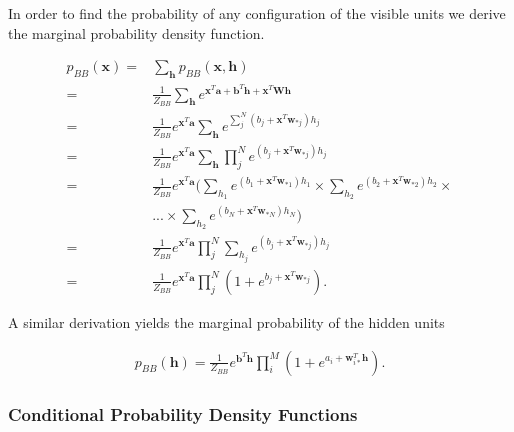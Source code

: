 In order to find the probability of any configuration of the visible units we derive the marginal probability density function.

\begin{align}
	p_{BB} (\bm{x}) =& \sum_{\bm{h}} p_{BB} (\bm{x}, \bm{h}) \\
	=& \frac{1}{Z_{BB}} \sum_{\bm{h}} e^{\bm{x}^T \bm{a} + \bm{b}^T \bm{h} + \bm{x}^T \bm{W} \bm{h}} \nonumber \\
	=& \frac{1}{Z_{BB}} e^{\bm{x}^T \bm{a}} \sum_{\bm{h}} e^{\sum_j^N (b_j + \bm{x}^T \bm{w}_{\ast j})h_j} \nonumber \\
	=& \frac{1}{Z_{BB}} e^{\bm{x}^T \bm{a}} \sum_{\bm{h}} \prod_j^N e^{ (b_j + \bm{x}^T \bm{w}_{\ast j})h_j} \nonumber \\
	=& \frac{1}{Z_{BB}} e^{\bm{x}^T \bm{a}} \bigg ( \sum_{h_1} e^{(b_1 + \bm{x}^T \bm{w}_{\ast 1})h_1}
	\times \sum_{h_2} e^{(b_2 + \bm{x}^T \bm{w}_{\ast 2})h_2} \times \nonumber \\
	& ... \times \sum_{h_2} e^{(b_N + \bm{x}^T \bm{w}_{\ast N})h_N} \bigg ) \nonumber \\
	=& \frac{1}{Z_{BB}} e^{\bm{x}^T \bm{a}} \prod_j^N \sum_{h_j} e^{(b_j + \bm{x}^T \bm{w}_{\ast j}) h_j} \nonumber \\
	=& \frac{1}{Z_{BB}} e^{\bm{x}^T \bm{a}} \prod_j^N (1 + e^{b_j + \bm{x}^T \bm{w}_{\ast j}}) .
\end{align}

A similar derivation yields the marginal probability of the hidden units

\begin{align}
	p_{BB} (\bm{h}) = \frac{1}{Z_{BB}} e^{\bm{b}^T \bm{h}} \prod_i^M (1 + e^{a_i + \bm{w}_{i\ast}^T \bm{h}}) .
\end{align}


\subsubsection{Conditional Probability Density Functions}

